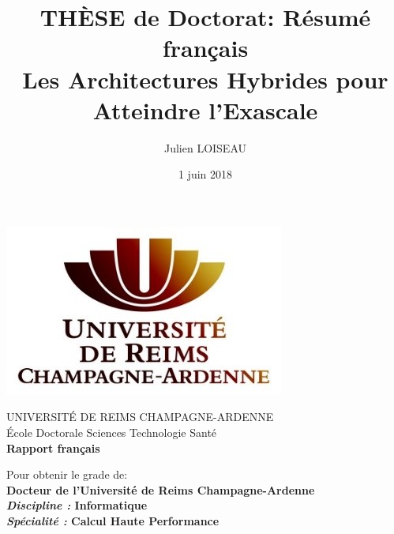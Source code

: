 \documentclass[12pt,a4paper]{report}
\title{TH\`ESE de Doctorat: Résumé français\\Les Architectures Hybrides pour Atteindre l'Exascale}
\author{Julien LOISEAU}
\date{1 juin 2018}
\begin{document}
\newcommand{\phdAuthor}{Julien LOISEAU}
\newcommand{\defenseDate}{le 18 Mars 2018}
\newcommand{\phdDiscipline}{Informatique}
\newcommand{\phdSpeciality}{Calcul Haute Performance}
\newcommand{\phdTitleEN}{Hybrids Architectures to Reach Exascale}
\newcommand{\phdTitleFR}{Les Architectures Hybrides pour Atteindre l'Exascale}
\newcommand{\phdDirector}{Michaël KRAJECKI, Professeur des Universités}


\thispagestyle{empty}
{
\centering

{
	\includegraphics[scale=1]{../figures/style/logo_urca_front_page.jpg}
	\vspace{0.5cm}
}

{
	UNIVERSIT\'E DE REIMS CHAMPAGNE-ARDENNE\\
	\vspace{0.5cm}
	\'Ecole Doctorale Sciences Technologie Sant\'e\\
	\vspace{1cm}
	\huge
	\textbf{Rapport français}
	\vspace{.5cm}
}

{
	Pour obtenir le grade de:\\ 
	\vspace{.4cm}
	\Large 
	\textbf{Docteur de l'Université de Reims Champagne-Ardenne}\\
	\vspace{.4cm}
	\large
	\textbf{\textit{Discipline : }\phdDiscipline}\\
	\vspace{.4cm}
	\textbf{\textit{Sp\'ecialit\'e : }\phdSpeciality}
}

}
\end{document}
